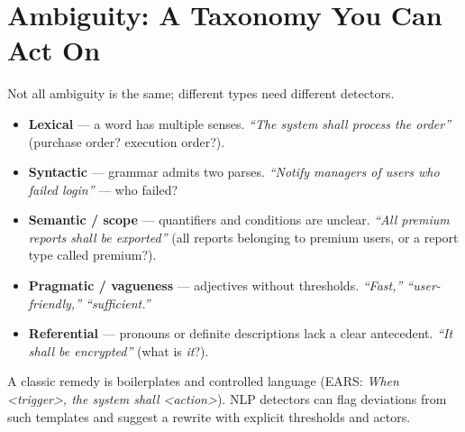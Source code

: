 \section{Ambiguity: A Taxonomy You Can Act On}\label{sec:ambiguity}
Not all ambiguity is the same; different types need different detectors.

\begin{itemize}[leftmargin=1.2em, itemsep=0.35em]
  \item \textbf{Lexical} --- a word has multiple senses. \emph{``The system shall process the order''} (purchase order? execution order?).
  \item \textbf{Syntactic} --- grammar admits two parses. \emph{``Notify managers of users who failed login''} --- who failed?
  \item \textbf{Semantic / scope} --- quantifiers and conditions are unclear. \emph{``All premium reports shall be exported''} (all reports belonging to premium users, or a report type called premium?).
  \item \textbf{Pragmatic / vagueness} --- adjectives without thresholds. \emph{``Fast,'' ``user-friendly,'' ``sufficient.''}
  \item \textbf{Referential} --- pronouns or definite descriptions lack a clear antecedent. \emph{``It shall be encrypted''} (what is \emph{it}?).
\end{itemize}

A classic remedy is boilerplates and controlled language (EARS: \emph{When \textless trigger\textgreater, the system shall \textless action\textgreater}). NLP detectors can flag deviations from such templates and suggest a rewrite with explicit thresholds and actors.

